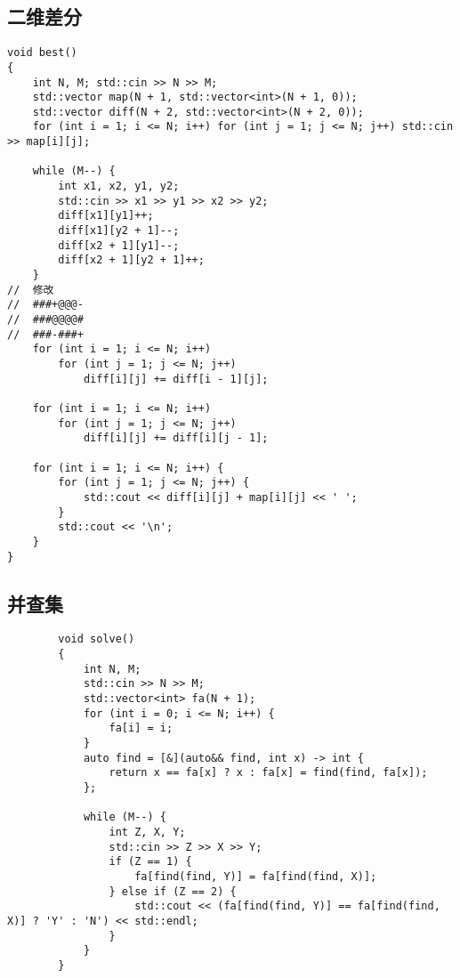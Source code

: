 \documentclass[a4paper, 10pt]{paper}
\begin{document}
        \subsection{二维差分}
        \begin{verbatim}
void best()
{
    int N, M; std::cin >> N >> M;
    std::vector map(N + 1, std::vector<int>(N + 1, 0));
    std::vector diff(N + 2, std::vector<int>(N + 2, 0));
    for (int i = 1; i <= N; i++) for (int j = 1; j <= N; j++) std::cin >> map[i][j];

    while (M--) {
        int x1, x2, y1, y2;
        std::cin >> x1 >> y1 >> x2 >> y2;
        diff[x1][y1]++;
        diff[x1][y2 + 1]--;
        diff[x2 + 1][y1]--;
        diff[x2 + 1][y2 + 1]++;
    }
//  修改
//  ###+@@@-
//  ###@@@@#
//  ###-###+
    for (int i = 1; i <= N; i++)
        for (int j = 1; j <= N; j++)
            diff[i][j] += diff[i - 1][j];

    for (int i = 1; i <= N; i++)
        for (int j = 1; j <= N; j++)
            diff[i][j] += diff[i][j - 1];

    for (int i = 1; i <= N; i++) {
        for (int j = 1; j <= N; j++) {
            std::cout << diff[i][j] + map[i][j] << ' ';
        }
        std::cout << '\n';
    }
}
        \end{verbatim}

        \subsection{并查集}
        \begin{verbatim}
        void solve()
        {
            int N, M;
            std::cin >> N >> M;
            std::vector<int> fa(N + 1);
            for (int i = 0; i <= N; i++) {
                fa[i] = i;
            }
            auto find = [&](auto&& find, int x) -> int {
                return x == fa[x] ? x : fa[x] = find(find, fa[x]);
            };
        
            while (M--) {
                int Z, X, Y;
                std::cin >> Z >> X >> Y;
                if (Z == 1) {
                    fa[find(find, Y)] = fa[find(find, X)];
                } else if (Z == 2) {
                    std::cout << (fa[find(find, Y)] == fa[find(find, X)] ? 'Y' : 'N') << std::endl;
                }
            }
        }
        \end{verbatim}
\end{document}
